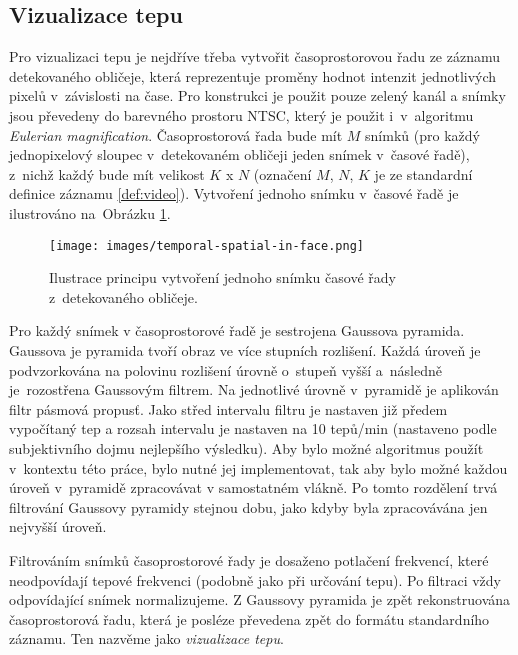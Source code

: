 \documentclass[
  digital, %
  table,   %
%
  lof,     %
  lot,     %
]{fithesis3}
\begin{document}
\subsection{Vizualizace tepu}
Pro vizualizaci tepu je nejdříve třeba vytvořit časoprostorovou řadu ze záznamu detekovaného obličeje, která reprezentuje proměny hodnot intenzit jednotlivých pixelů v~závislosti na čase. Pro konstrukci je použit pouze zelený kanál a snímky jsou převedeny do barevného prostoru NTSC, který je použit i~v~algoritmu \emph{Eulerian magnification}. Časoprostorová řada bude mít $M$ snímků (pro každý jednopixelový sloupec v~detekovaném obličeji jeden snímek v~časové řadě), z~nichž každý bude mít velikost $K$ x $N$ (označení $M$, $N$, $K$ je ze standardní definice záznamu \ref{def:video}). Vytvoření jednoho snímku v~časové řadě je ilustrováno na~Obrázku \ref{fig:temporal-spatial-in-face}.

\begin{figure}
  \begin{center}
    \texttt{[image: images/temporal-spatial-in-face.png]}
  \end{center}
  \caption{Ilustrace principu vytvoření jednoho snímku časové řady z~detekovaného obličeje.}
  \label{fig:temporal-spatial-in-face}
\end{figure}

Pro každý snímek v časoprostorové řadě je sestrojena Gaussova pyramida. Gaussova je pyramida tvoří obraz ve více stupních rozlišení. Každá úroveň je podvzorkována na polovinu rozlišení úrovně o~stupeň vyšší a~následně je~rozostřena Gaussovým filtrem. Na jednotlivé úrovně v~pyramidě je aplikován filtr pásmová propusť. Jako střed intervalu filtru je nastaven již předem vypočítaný tep a rozsah intervalu je nastaven na 10 tepů/min (nastaveno podle subjektivního dojmu nejlepšího výsledku). Aby bylo možné algoritmus použít v~kontextu této práce, bylo nutné jej implementovat, tak aby bylo možné každou úroveň v~pyramidě zpracovávat v samostatném vlákně. Po tomto rozdělení trvá filtrování Gaussovy pyramidy stejnou dobu, jako kdyby byla zpracovávána jen nejvyšší úroveň. 

Filtrováním snímků časoprostorové řady je dosaženo potlačení frekvencí, které neodpovídají tepové frekvenci (podobně jako při určování tepu). Po filtraci vždy odpovídající snímek normalizujeme. Z Gaussovy pyramida je zpět rekonstruována časoprostorová řadu, která je posléze převedena zpět do formátu standardního záznamu. Ten nazvěme jako \emph{vizualizace tepu}.
\end{document}

